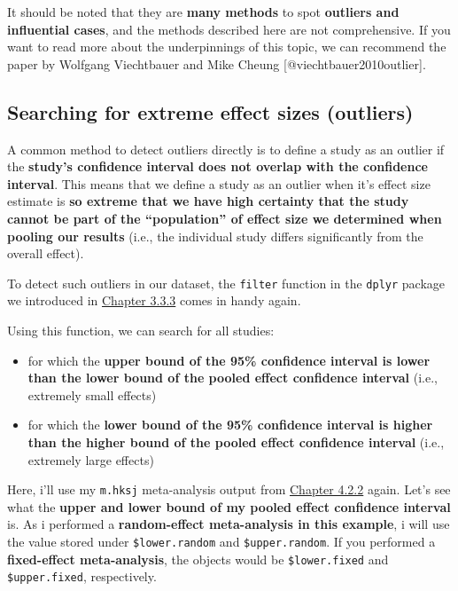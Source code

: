 \documentclass[]{book}
\providecommand{\tightlist}{%
  \setlength{\itemsep}{0pt}\setlength{\parskip}{0pt}}
\begin{document}
\begin{rmdachtung}
It should be noted that they are \textbf{many methods} to spot
\textbf{outliers and influential cases}, and the methods described here
are not comprehensive. If you want to read more about the underpinnings
of this topic, we can recommend the paper by Wolfgang Viechtbauer and
Mike Cheung {[}@viechtbauer2010outlier{]}.
\end{rmdachtung}

\hypertarget{outliers}{%
\subsection{Searching for extreme effect sizes (outliers)}\label{outliers}}

A common method to detect outliers directly is to define a study as an outlier if the \textbf{study's confidence interval does not overlap with the confidence interval}. This means that we define a study as an outlier when it's effect size estimate is \textbf{so extreme that we have high certainty that the study cannot be part of the ``population'' of effect size we determined when pooling our results} (i.e., the individual study differs significantly from the overall effect).

To detect such outliers in our dataset, the \texttt{filter} function in the \texttt{dplyr} package we introduced in \protect\hyperlink{filter}{Chapter 3.3.3} comes in handy again.

Using this function, we can search for all studies:

\begin{itemize}
\tightlist
\item
  for which the \textbf{upper bound of the 95\% confidence interval is lower than the lower bound of the pooled effect confidence interval} (i.e., extremely small effects)
\item
  for which the \textbf{lower bound of the 95\% confidence interval is higher than the higher bound of the pooled effect confidence interval} (i.e., extremely large effects)
\end{itemize}

Here, i'll use my \texttt{m.hksj} meta-analysis output from \protect\hyperlink{random.precalc}{Chapter 4.2.2} again. Let's see what the \textbf{upper and lower bound of my pooled effect confidence interval} is. As i performed a \textbf{random-effect meta-analysis in this example}, i will use the value stored under \texttt{\$lower.random} and \texttt{\$upper.random}. If you performed a \textbf{fixed-effect meta-analysis}, the objects would be \texttt{\$lower.fixed} and \texttt{\$upper.fixed}, respectively.
\end{document}
